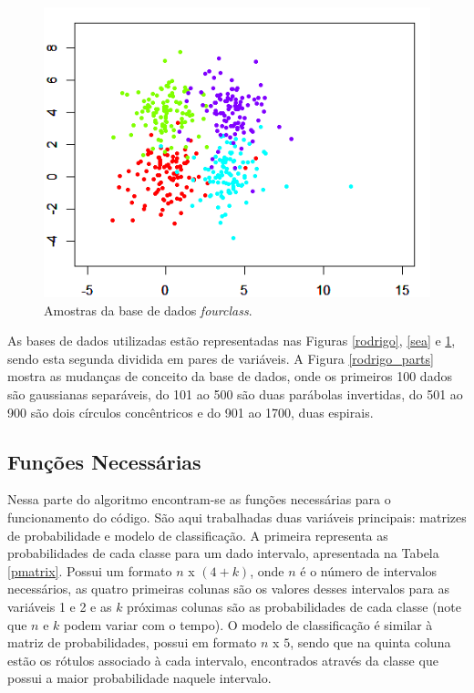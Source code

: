 \documentclass[conference]{IEEEtran}
\begin{document}
\begin{figure}[h]
\centerline{\includegraphics[width=0.6\columnwidth]{fig/four.png}}
\caption{Amostras da base de dados \textit{fourclass}.}
\label{four}
\end{figure}

As bases de dados utilizadas estão representadas nas Figuras \ref{rodrigo}, \ref{sea} e \ref{four}, sendo esta segunda dividida em pares de variáveis. A Figura \ref{rodrigo_parts} mostra as mudanças de conceito da base de dados, onde os primeiros 100 dados são gaussianas separáveis, do 101 ao 500 são duas parábolas invertidas, do 501 ao 900 são dois círculos concêntricos e do 901 ao 1700, duas espirais.



\subsection{Funções Necessárias} \label{metod_2}

Nessa parte do algoritmo encontram-se as funções necessárias para o funcionamento do código. São aqui trabalhadas duas variáveis principais: matrizes de probabilidade e modelo de classificação. A primeira representa as probabilidades de cada classe para um dado intervalo, apresentada na Tabela \ref{pmatrix}. Possui um formato $n$ x $(4+k)$, onde $n$ é o número de intervalos necessários, as quatro primeiras colunas são os valores desses intervalos para as variáveis 1 e 2 e as $k$ próximas colunas são as probabilidades de cada classe (note que $n$ e $k$ podem variar com o tempo). O modelo de classificação é similar à matriz de probabilidades, possui em formato $n$ x $5$, sendo que na quinta coluna estão os rótulos associado à cada intervalo, encontrados através da classe que possui a maior probabilidade naquele intervalo.
\end{document}
